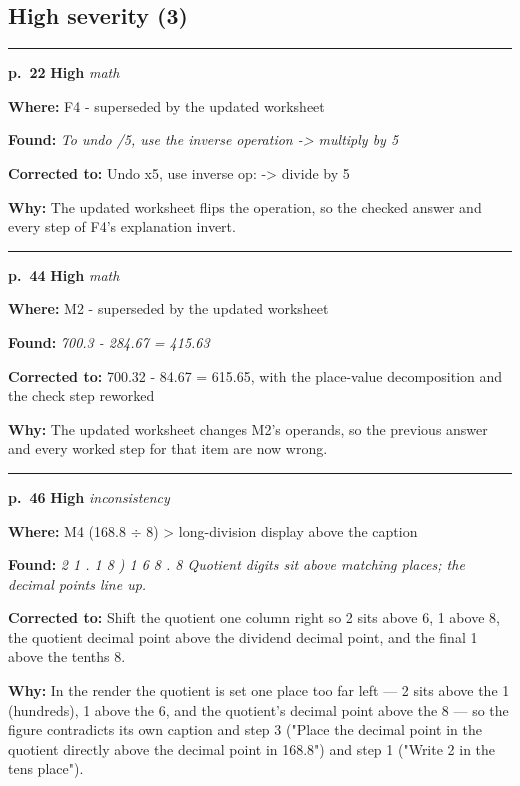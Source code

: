 \documentclass[11pt]{article}
\newcommand{\sevhigh}[1]{\textcolor{red!75!black}{\textbf{#1}}}
\begin{document}
\subsection*{High severity (3)}
\noindent\rule{\textwidth}{0.4pt}\par\nobreak\vspace{2pt}
\noindent\textbf{p.~22} \quad \sevhigh{High} \quad \textit{math}\par
\noindent\textbf{Where: }F4 - superseded by the updated worksheet\par
\noindent\textbf{Found: }\textit{To undo /5, use the inverse operation -> multiply by 5}\par
\noindent\textbf{Corrected to: }Undo x5, use inverse op: -> divide by 5\par
\noindent\textbf{Why: }The updated worksheet flips the operation, so the checked answer and every step of F4's explanation invert.\par\vspace{4pt}
\noindent\rule{\textwidth}{0.4pt}\par\nobreak\vspace{2pt}
\noindent\textbf{p.~44} \quad \sevhigh{High} \quad \textit{math}\par
\noindent\textbf{Where: }M2 - superseded by the updated worksheet\par
\noindent\textbf{Found: }\textit{700.3 - 284.67 = 415.63}\par
\noindent\textbf{Corrected to: }700.32 - 84.67 = 615.65, with the place-value decomposition and the check step reworked\par
\noindent\textbf{Why: }The updated worksheet changes M2's operands, so the previous answer and every worked step for that item are now wrong.\par\vspace{4pt}
\noindent\rule{\textwidth}{0.4pt}\par\nobreak\vspace{2pt}
\noindent\textbf{p.~46} \quad \sevhigh{High} \quad \textit{inconsistency}\par
\noindent\textbf{Where: }M4 (168.8 $\div$ 8) > long-division display above the caption\par
\noindent\textbf{Found: }\textit{2 1 . 1 8 ) 1 6 8 . 8 Quotient digits sit above matching places; the decimal points line up.}\par
\noindent\textbf{Corrected to: }Shift the quotient one column right so 2 sits above 6, 1 above 8, the quotient decimal point above the dividend decimal point, and the final 1 above the tenths 8.\par
\noindent\textbf{Why: }In the render the quotient is set one place too far left --- 2 sits above the 1 (hundreds), 1 above the 6, and the quotient's decimal point above the 8 --- so the figure contradicts its own caption and step 3 ("Place the decimal point in the quotient directly above the decimal point in 168.8") and step 1 ("Write 2 in the tens place").\par\vspace{4pt}
\end{document}
